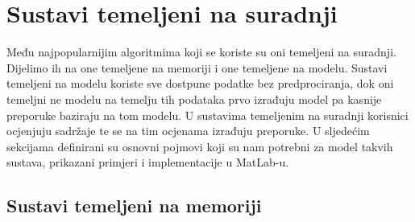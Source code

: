 \documentclass[a4paper,oneside,12pt]{memoir} %
\begin{document}
\chapter{Sustavi temeljeni na suradnji}
\label{ch: sustavi temeljeni na suradnji}
\par 
Među najpopularnijim algoritmima koji se koriste su oni temeljeni na suradnji. Dijelimo ih na one temeljene na memoriji i one temeljene na modelu. Sustavi temeljeni na modelu koriste sve dostpune podatke bez predprociranja, dok oni temeljni ne modelu na temelju tih podataka prvo izrađuju model pa kasnije preporuke baziraju na tom modelu. U sustavima temeljenim na suradnji korisnici ocjenjuju sadržaje te se na tim ocjenama izrađuju preporuke. U sljedećim sekcijama definirani su osnovni pojmovi koji su nam potrebni za model takvih sustava, prikazani primjeri i implementacije u MatLab-u.
\section{Sustavi temeljeni na memoriji}
\label{sec: sustavi temeljeni na memoriji}
\end{document}
